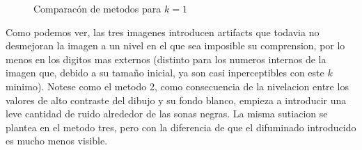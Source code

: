 \begin{figure}[H]
    \centering
    \qquad
    \qquad
    \caption{Comparacón de metodos para $k = 1$}
    \label{fig:example}
\end{figure}

Como podemos ver, las tres imagenes introducen artifacts que todavia no desmejoran la imagen a un nivel en el que sea imposible su comprension, por lo menos en los digitos mas externos (distinto para los numeros internos de la imagen que, debido a su tamaño inicial, ya son casi inperceptibles con este $k$ minimo). Notese como el metodo 2, como consecuencia de la nivelacion entre los valores de alto contraste del dibujo y su fondo blanco, empieza a introducir una leve cantidad de ruido alrededor de las sonas negras. La misma sutiacion se plantea en el metodo tres, pero con la diferencia de que el difuminado introducido es mucho menos visible.


